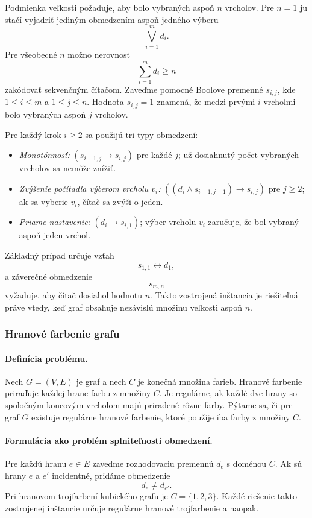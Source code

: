Podmienka veľkosti požaduje, aby bolo vybraných aspoň $n$ vrcholov. Pre $n=1$ ju stačí vyjadriť jediným obmedzením aspoň jedného výberu
\[
    \bigvee_{i=1}^{m} d_i.
\]
Pre všeobecné $n$ možno nerovnosť
\[
    \sum_{i=1}^{m} d_i \geq n
\]
zakódovať sekvenčným čítačom. Zaveďme pomocné Boolove premenné $s_{i,j}$, kde $1 \leq i \leq m$ a $1 \leq j \leq n$. Hodnota $s_{i,j}=1$ znamená, že medzi prvými $i$ vrcholmi bolo vybraných aspoň $j$ vrcholov.

Pre každý krok $i \geq 2$ sa použijú tri typy obmedzení:
\begin{itemize}
    \item \emph{Monotónnosť:} $(s_{i-1,j} \to s_{i,j})$ pre každé $j$; už dosiahnutý počet vybraných vrcholov sa nemôže znížiť.
    \item \emph{Zvýšenie počítadla výberom vrcholu $v_i$:} $((d_i \land s_{i-1,j-1}) \to s_{i,j})$ pre $j \geq 2$; ak sa vyberie $v_i$, čítač sa zvýši o jeden.
    \item \emph{Priame nastavenie:} $(d_i \to s_{i,1})$; výber vrcholu $v_i$ zaručuje, že bol vybraný aspoň jeden vrchol.
\end{itemize}
Základný prípad určuje vzťah
\[
    s_{1,1} \leftrightarrow d_1,
\]
a záverečné obmedzenie
\[
    s_{m,n}
\]
vyžaduje, aby čítač dosiahol hodnotu $n$. Takto zostrojená inštancia je riešiteľná práve vtedy, keď graf obsahuje nezávislú množinu veľkosti aspoň $n$.

\subsubsection{Hranové farbenie grafu}\label{sec:combinatorics:edge-coloring}
\paragraph{Definícia problému.}
Nech $G=(V,E)$ je graf a nech $C$ je konečná množina farieb. Hranové farbenie priraďuje každej hrane farbu z množiny $C$. Je regulárne, ak každé dve hrany so spoločným koncovým vrcholom majú priradené rôzne farby. Pýtame sa, či pre graf $G$ existuje regulárne hranové farbenie, ktoré použije iba farby z množiny $C$.

\paragraph{Formulácia ako problém splniteľnosti obmedzení.}
Pre každú hranu $e \in E$ zaveďme rozhodovaciu premennú $d_e$ s doménou $C$. Ak sú hrany $e$ a $e'$ incidentné, pridáme obmedzenie
\[
    d_e \neq d_{e'}.
\]
Pri hranovom trojfarbení kubického grafu je $C=\{1,2,3\}$. Každé riešenie takto zostrojenej inštancie určuje regulárne hranové trojfarbenie a naopak.

